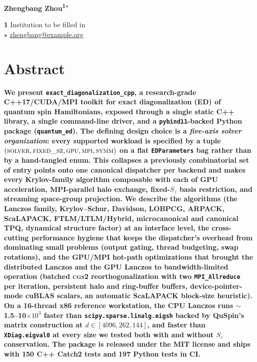 \documentclass[submission, PhysCodeb]{SciPost}
\begin{document}
\begin{center}{\Large \textbf{}}\end{center}

\begin{center}\textbf{
Zhengbang Zhou\textsuperscript{1$\star$}
}\end{center}

\begin{center}
{\bf 1} Institution to be filled in
\\[\bigskipamount]
$\star$ \href{mailto:zhengbang@example.org}{\small zhengbang@example.org}
\end{center}

\section*{Abstract}
{\bf
We present \texttt{exact\_diagonalization\_cpp}, a research-grade
C++17/CUDA/MPI toolkit for exact diagonalization (ED) of quantum
spin Hamiltonians, exposed through a single static C++ library, a
single command-line driver, and a \texttt{pybind11}-backed Python
package (\texttt{quantum\_ed}). The defining design choice is a
\emph{five-axis solver organization}: every supported workload is
specified by a tuple
$(\textsc{solver}, \textsc{fixed\_sz}, \textsc{gpu}, \textsc{mpi},
\textsc{symm})$ on a flat \texttt{EDParameters} bag rather than by a
hand-tangled enum. This collapses a previously combinatorial set of
entry points onto one canonical dispatcher per backend and makes
every Krylov-family algorithm composable with each of GPU acceleration,
MPI-parallel halo exchange, fixed-$S_z$ basis restriction, and
streaming space-group projection. We describe the algorithms (the
Lanczos family, Krylov--Schur, Davidson, LOBPCG, ARPACK, ScaLAPACK,
FTLM/LTLM/Hybrid, microcanonical and canonical TPQ, dynamical
structure factor) at an interface level, the cross-cutting
performance hygiene that keeps the dispatcher's overhead from
dominating small problems (output gating, thread budgeting, swap
rotations), and the GPU/MPI hot-path optimizations that brought the
distributed Lanczos and the GPU Lanczos to bandwidth-limited
operation (batched \textsc{cgs2} reorthogonalization with two
\texttt{MPI\_Allreduce} per iteration, persistent halo and ring-buffer
buffers, device-pointer-mode cuBLAS scalars, an automatic ScaLAPACK
block-size heuristic). On a 16-thread x86 reference workstation, the
CPU Lanczos runs $\sim$1.5--10$\times 10^3$ faster than
\texttt{scipy.sparse.linalg.eigsh} backed by QuSpin's matrix
construction at $d \in [4096, 262{,}144]$, and faster than
\texttt{XDiag.eigval0} at every size we tested both with and without
$S_z$ conservation. The package is released under the MIT license and
ships with 150 C++ Catch2 tests and 197 Python tests in CI.
}
\end{document}
